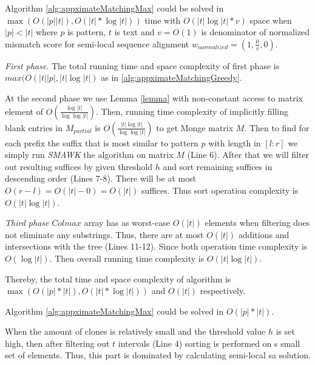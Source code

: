 \begin{theorem}
Algorithm \ref{alg:appximateMatchingMax} could  be solved in
$\max (O(|p||t|), O(|t|* \log |t|))$ time with $O(|t|  \log {|t| * v })$ space when $|p|<|t|$ where $p$ is pattern, $t$ is text and $v=O(1)$ is denominator of normalized mismatch score for semi-local sequence alignment
$w_{normalized} = (1,\frac{\mu}{v},0)$.
\end{theorem}

\emph{First phase}.
The total running time and space complexity of first phase is 
$max(O(|t||p|, |t| \log |t|)$ as in \ref{alg:appximateMatchingGreedy}.


At the second phase we use Lemma \ref{lemma} with non-constant access to matrix element of $O(\frac{\log |t|}{\log \log |t|})$.
Then, running time complexity of implicitly filling
blank entries in $M_{partial}$ is 
$O(\frac{|t| \log |t|}{\log \log |t|})$ to get Monge matrix $M$.
Then to find for each prefix the suffix that is most similar to pattern $p$ with length in $[l:r]$ we simply run \emph{SMAWK}
the algorithm on matrix $M$ (Line 6).
After that we will filter out resulting suffices by given threshold $h$ and sort remaining suffices in descending order (Lines 7-8).
There will be at most $O(r-l)=O(|t| - 0) = O(|t|)$ suffices.
Thus sort operation complexity  is $O(|t| \log |t|)$.

\emph{Third phase}
$Colmax$ array has as worst-case $O(|t|)$ elements when filtering does not eliminate any substrings.
Thus, 
there are at most $O(|t|)$ additions and intersections with the tree (Lines 11-12).
Since both operation time complexity is  $O(\log |t|)$.
Then overall running time complexity is $O(|t|\log |t|)$.

Thereby, the total time and space complexity of algorithm is $\max (O(|p|*|t|), O(|t|* \log |t| ))$ and $O(|t|)$  respectively.
 

\begin{corollary}
Algorithm \ref{alg:appximateMatchingMax} could  be solved in 
$O(|p| * |t|)$.
\end{corollary}

When the amount of clones is relatively small and the threshold value $h$ is set high,  then after filtering out $t$ intervals (Line 4) sorting is performed on s small set of elements.
Thus, this part is dominated by calculating semi-local sa solution.







  


 
